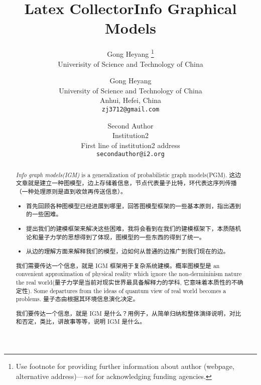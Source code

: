 \documentclass{article}
\title{{Latex Collector}}
\author{
   Gong Heyang \thanks{Use footnote for providing further
    information about author (webpage, alternative
    address)---\emph{not} for acknowledging funding agencies.} \\
    Univerisity of Science and Technology of China \\
}
\theoremstyle{definition}
\theoremstyle{remark}
\theoremstyle{definition}
\begin{document}
\begin{CJK*}{UTF8}{gbsn}

\title{Info Graphical Models}

\author{Gong Heyang\\
University of Science and Technology of China\\
Anhui, Hefei, China\\
{\tt\small zj3712@gmail.com}
\and
Second Author\\
Institution2\\
First line of institution2 address\\
{\tt\small secondauthor@i2.org}
}

\maketitle

\begin{abstract}
    \emph{Info graph models(IGM)} is a generalization of probabilistic graph models(PGM). 这边文章就是建立一种图模型，边上存储着信息，节点代表量子比特，环代表这序列传播（一种处理原则是直到收敛再传送信息）。 
    \begin{itemize}
        \item 首先回顾各种图模型已经进展到哪里，回答图模型框架的一些基本原则，指出遇到的一些困难。 
        \item 提出我们的建模框架来解决这些困难，我将会看到在我们的建模框架下，本质随机论和量子力学的思想得到了体现，图模型的一些东西的得到了统一。
        \item 从边的理解方面来解释我们的模型，边如何从普通的边推广到我们现在的边。
    \end{itemize}
    
    我们需要传达一个信息，就是 IGM 框架用于复杂系统建模。概率图模型是 an convenient approximation of physical reality which ignore the non-dermininism nature the real world(量子力学是当前对现实世界最具备解释力的学科, 它意味着本质性的不确定性). Some departures from the ideas of quantum view of real world becomes a problems. 量子态由根据其环境信息演化决定。
    
    我们要传达一个信息，就是 IGM 是什么？用例子，从简单归纳和整体演绎说明，对比和否定，类比，讲故事等等，说明 IGM 是什么。
    

\end{abstract}
\end{CJK*}
\end{document}
